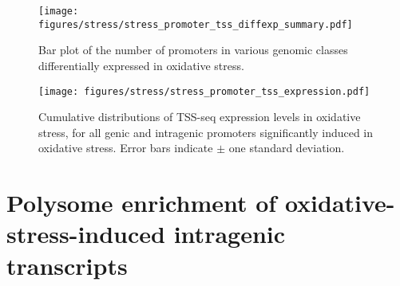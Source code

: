\begin{figure}[h]
    \texttt{[image: figures/stress/stress\_promoter\_tss\_diffexp\_summary.pdf]}
    \caption[Bar plot of the number of promoters in various genomic classes differentially expressed in oxidative stress.]{Bar plot of the number of promoters in various genomic classes differentially expressed in oxidative stress.}
    \label{fig:stress_promoter_tss_diffexp_summary}
\end{figure}

\begin{figure}[h]
    \texttt{[image: figures/stress/stress\_promoter\_tss\_expression.pdf]}
    \caption[TSS-seq expression levels in oxidative stress of oxidative-stress-induced genic and intragenic promoters.]{Cumulative distributions of TSS-seq expression levels in oxidative stress, for all genic and intragenic promoters significantly induced in oxidative stress. Error bars indicate $\pm$ one standard deviation.}
    \label{fig:stress_promoter_tss_expression}
\end{figure}

\clearpage




\section{Polysome enrichment of oxidative-stress-induced intragenic transcripts}

